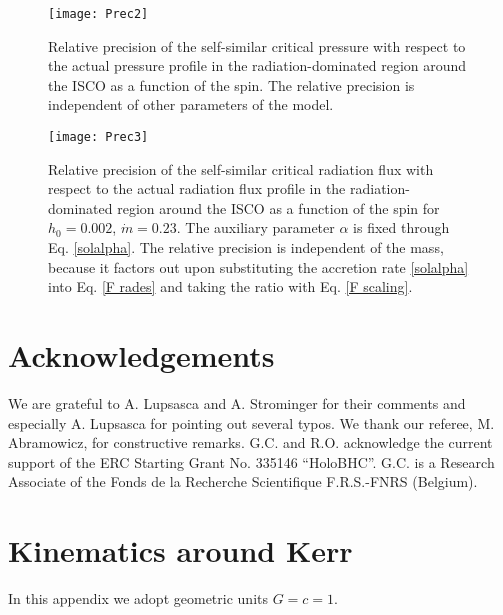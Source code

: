 \documentclass[a4paper,fleqn,usenatbib]{mnrasMOD}
\numberwithin{equation}{section}
\begin{document}
\begin{figure}
\centering
\texttt{[image: Prec2]}
\caption{Relative precision of the self-similar critical pressure with respect to the actual pressure profile in the radiation-dominated region around the ISCO as a function of the spin. The relative precision is independent of other parameters of the model.}
\label{Prec2}
\end{figure}

\begin{figure}
\centering
\texttt{[image: Prec3]}
\caption{Relative precision of the self-similar critical radiation flux with respect to the actual radiation flux profile in the radiation-dominated region around the ISCO as a function of the spin for $h_{0}= 0.002$, $\dot m =0.23$. The auxiliary parameter $\alpha$ is fixed through Eq. \eqref{solalpha}. The relative precision is independent of the mass, because it factors out upon substituting the accretion rate \eqref{solalpha} into Eq. \eqref{F rades} and taking the ratio with Eq. \eqref{F scaling}.} 
\label{Prec3}
\end{figure}



\vspace{-0.2cm}
\section*{Acknowledgements}
We are grateful to A. Lupsasca and A. Strominger for their comments and especially A. Lupsasca for pointing out several typos. We thank our referee, M. Abramowicz, for constructive remarks. G.C. and R.O. acknowledge  the  current  support  of  the  ERC  Starting  Grant  No.   335146  ``HoloBHC''. G.C. is a Research Associate of the Fonds de la Recherche Scientifique F.R.S.-FNRS (Belgium). 


\appendix

\section{Kinematics around Kerr}\label{appKerr}

In this appendix we adopt geometric units $G = c = 1$. 
\end{document}
